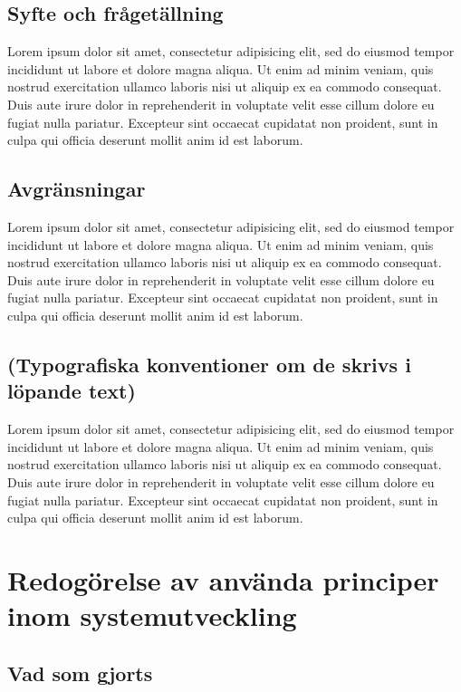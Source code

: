 \documentclass[a4paper,12pt,oneside,final]{extbook}
\begin{document}
\section{Syfte och frågetällning}

Lorem ipsum dolor sit amet, consectetur adipisicing elit, sed do eiusmod tempor incididunt ut labore et dolore magna aliqua. Ut enim ad minim veniam, quis nostrud exercitation ullamco laboris nisi ut aliquip ex ea commodo consequat. Duis aute irure dolor in reprehenderit in voluptate velit esse cillum dolore eu fugiat nulla pariatur. Excepteur sint occaecat cupidatat non proident, sunt in culpa qui officia deserunt mollit anim id est laborum.

\section{Avgränsningar}

Lorem ipsum dolor sit amet, consectetur adipisicing elit, sed do eiusmod tempor incididunt ut labore et dolore magna aliqua. Ut enim ad minim veniam, quis nostrud exercitation ullamco laboris nisi ut aliquip ex ea commodo consequat. Duis aute irure dolor in reprehenderit in voluptate velit esse cillum dolore eu fugiat nulla pariatur. Excepteur sint occaecat cupidatat non proident, sunt in culpa qui officia deserunt mollit anim id est laborum.

\section{(Typografiska konventioner om de skrivs i löpande text)}

Lorem ipsum dolor sit amet, consectetur adipisicing elit, sed do eiusmod tempor incididunt ut labore et dolore magna aliqua. Ut enim ad minim veniam, quis nostrud exercitation ullamco laboris nisi ut aliquip ex ea commodo consequat. Duis aute irure dolor in reprehenderit in voluptate velit esse cillum dolore eu fugiat nulla pariatur. Excepteur sint occaecat cupidatat non proident, sunt in culpa qui officia deserunt mollit anim id est laborum.

\chapter{Redogörelse av använda principer inom systemutveckling}

\section{Vad som gjorts}
\end{document}
